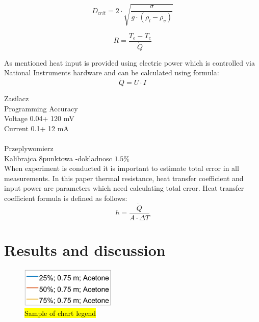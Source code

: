 \documentclass[article]{elsarticle}
\newcommand{\hlc}[2][yellow]{ {\sethlcolor{#1} \hl{#2}} }
\begin{document}
\begin{equation}
D_{crit}=2\cdot\sqrt{\frac{\sigma}{g\cdot(\rho_{l}-\rho_{v})}}
\label{Eqn:d_crit}
\end{equation}

\begin{equation}
R=\frac{T_e-T_c}{\dot{Q}}
\end{equation}

As mentioned heat input is provided using electric power which is controlled via National Instruments hardware and can be calculated using formula:
\begin{equation}
\dot{Q}=U\cdot I
\end{equation}

Zasilacz\\
Programming Accuracy \\
Voltage 0.04+ 120 mV\\
Current 0.1+ 12 mA\\\\

Przeplywomierz\\
Kalibrajca 8punktowa -dokladnosc $1.5\%$\\

When experiment is conducted it is important to estimate total error in all measurements. In this paper thermal resistance, heat transfer coefficient and input power are parameters which need calculating total error. Heat transfer coefficient formula is defined as follows:
\begin{equation}
h=\frac{\dot{Q}}{A\cdot \Delta T}
\end{equation}

\section{Results and discussion}

\begin{figure}[h]
\centering
\includegraphics[width=0.4\textwidth]{figures/legend.png}
\caption{\hlc{Sample of chart legend}}
\label{jdm1}
\end{figure}
\end{document}
